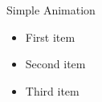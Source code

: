 \documentclass{beamer}
\begin{document}
\begin{frame}{Simple Animation}
    \begin{itemize}
        \item First item \pause
        \item Second item \pause
        \item Third item
    \end{itemize}
\end{frame}
\end{document}
